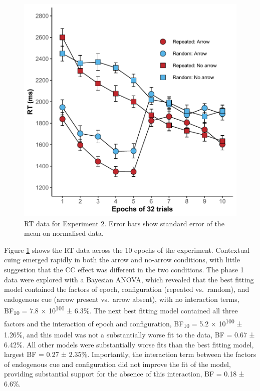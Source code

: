 \documentclass[
  man,floatsintext]{apa7}
\begin{document}
\begin{figure}

{\centering \includegraphics{CCC_ms1_files/figure-latex/Exp2-RT-figure-1} 

}

\caption{RT data for Experiment 2. Error bars show standard error of the mean on normalised data.}\label{fig:Exp2-RT-figure}
\end{figure}



Figure \ref{fig:Exp2-RT-figure} shows the RT data across the 10 epochs of the experiment. Contextual cuing emerged rapidly in both the arrow and no-arrow conditions, with little suggestion that the CC effect was different in the two conditions. The phase 1 data were explored with a Bayesian ANOVA, which revealed that the best fitting model contained the factors of epoch, configuration (repeated vs.~random), and endogenous cue (arrow present vs.~arrow absent), with no interaction terms, BF\textsubscript{10} = 7.8 × 10\textsuperscript{100} ± 6.3\%. The next best fitting model contained all three factors and the interaction of epoch and configuration, BF\textsubscript{10} = 5.2 × 10\textsuperscript{100} ± 1.26\%, and this model was not a substantially worse fit to the data, BF = 0.67 ± 6.42\%. All other models were substantially worse fits than the best fitting model, largest BF = 0.27 ± 2.35\%. Importantly, the interaction term between the factors of endogenous cue and configuration did not improve the fit of the model, providing substantial support for the absence of this interaction, BF = 0.18 ± 6.6\%.
\end{document}
